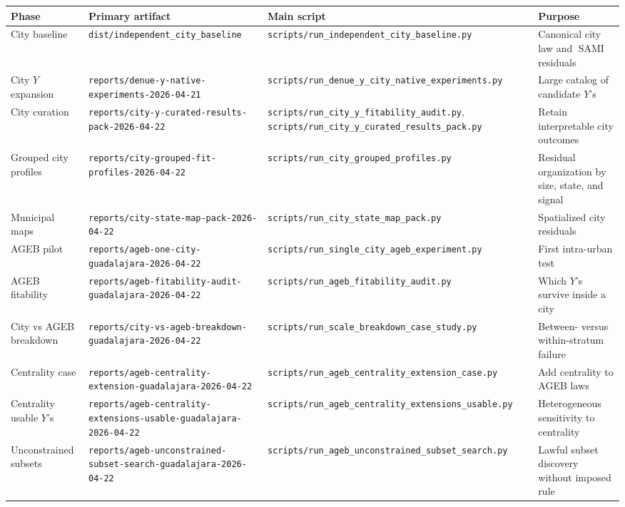 \documentclass[11pt]{article}
\newcommand{\SAMI}{\operatorname{SAMI}}
\begin{document}
\begin{landscape}
\small
\begin{longtable}{p{}p{}p{}p{}}
\toprule
\textbf{Phase} & \textbf{Primary artifact} & \textbf{Main script} & \textbf{Purpose} \\
\midrule
\endhead
City baseline & \texttt{dist/independent\_city\_baseline} & \texttt{scripts/run\_independent\_city\_baseline.py} & Canonical city law and \(\SAMI\) residuals \\
City \(Y\) expansion & \texttt{reports/denue-y-native-experiments-2026-04-21} & \texttt{scripts/run\_denue\_y\_city\_native\_experiments.py} & Large catalog of candidate \(Y\)'s \\
City curation & \texttt{reports/city-y-curated-results-pack-2026-04-22} & \texttt{scripts/run\_city\_y\_fitability\_audit.py}, \texttt{scripts/run\_city\_y\_curated\_results\_pack.py} & Retain interpretable city outcomes \\
Grouped city profiles & \texttt{reports/city-grouped-fit-profiles-2026-04-22} & \texttt{scripts/run\_city\_grouped\_profiles.py} & Residual organization by size, state, and signal \\
Municipal maps & \texttt{reports/city-state-map-pack-2026-04-22} & \texttt{scripts/run\_city\_state\_map\_pack.py} & Spatialized city residuals \\
AGEB pilot & \texttt{reports/ageb-one-city-guadalajara-2026-04-22} & \texttt{scripts/run\_single\_city\_ageb\_experiment.py} & First intra-urban test \\
AGEB fitability & \texttt{reports/ageb-fitability-audit-guadalajara-2026-04-22} & \texttt{scripts/run\_ageb\_fitability\_audit.py} & Which \(Y\)'s survive inside a city \\
City vs AGEB breakdown & \texttt{reports/city-vs-ageb-breakdown-guadalajara-2026-04-22} & \texttt{scripts/run\_scale\_breakdown\_case\_study.py} & Between- versus within-stratum failure \\
Centrality case & \texttt{reports/ageb-centrality-extension-guadalajara-2026-04-22} & \texttt{scripts/run\_ageb\_centrality\_extension\_case.py} & Add centrality to AGEB laws \\
Centrality usable \(Y\)'s & \texttt{reports/ageb-centrality-extensions-usable-guadalajara-2026-04-22} & \texttt{scripts/run\_ageb\_centrality\_extensions\_usable.py} & Heterogeneous sensitivity to centrality \\
Unconstrained subsets & \texttt{reports/ageb-unconstrained-subset-search-guadalajara-2026-04-22} & \texttt{scripts/run\_ageb\_unconstrained\_subset\_search.py} & Lawful subset discovery without imposed rule \\

\end{longtable}
\end{landscape}
\end{document}
